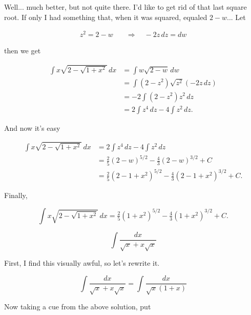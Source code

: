 \documentclass[12pt, letterpaper]{article}
\begin{document}
Well... much better, but not quite there. I'd like to get rid of that last square root. If only I had something that, when it was squared, equaled $2 - w$... Let

\begin{equation*}
\begin{aligned}
z^2 = 2 - w  \quad &\Rightarrow \quad -2z\, dz = dw
\end{aligned}
\end{equation*}

then we get

\begin{equation*}
\begin{aligned}
\int x \sqrt{2 - \sqrt{1 + x^2}} \, dx
  &= \int w\sqrt{2 - w} \, dw \\[0.2in]
  &= \int (2 - z^2)\sqrt{z^2} (-2z \, dz) \\[0.2in]
  &= -2 \int (2 - z^2)z^2 \, dz \\[0.2in]
  &= 2 \int z^4 \, dz - 4 \int z^2 \, dz .
\end{aligned}
\end{equation*}

And now it's easy

\begin{equation*}
\begin{aligned}
\int x \sqrt{2 - \sqrt{1 + x^2}} \, dx
  &= 2 \int z^4 \, dz - 4 \int z^2 \, dz \\[0.2in]
  &= \tfrac{2}{5} (2 - w)^{5/2} - \tfrac{4}{3} (2 - w)^{3/2} + C \\[0.2in]
  &= \tfrac{2}{5} (2 - 1 + x^2)^{5/2} - \tfrac{4}{3} (2 - 1 + x^2)^{3/2} + C.
\end{aligned}
\end{equation*}

Finally,

\begin{equation*}
\boxed
{
\int x \sqrt{2 - \sqrt{1 + x^2}} \, dx
  = \tfrac{2}{5} (1 + x^2)^{5/2} - \tfrac{4}{3} (1 + x^2)^{3/2} + C.
}
\end{equation*}



\newpage

$$ \int \frac{dx}{\sqrt{x} + x\sqrt{x}} $$

First, I find this visually awful, so let's rewrite it.

$$ \int \frac{dx}{\sqrt{x} + x\sqrt{x}} = \int \frac{dx}{\sqrt{x} (1 + x)} $$

Now taking a cue from the above solution, put
\end{document}
